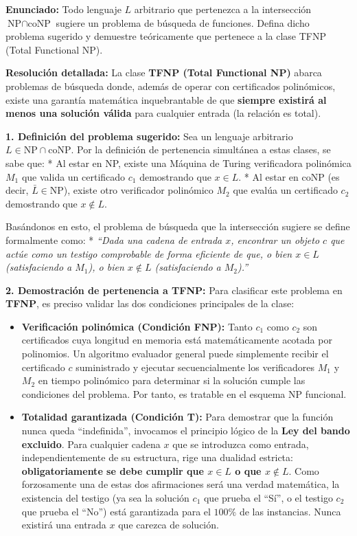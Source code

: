 \documentclass[12pt]{book} %
\providecommand{\tightlist}{%
  \setlength{\itemsep}{0pt}\setlength{\parskip}{0pt}}
\begin{document}
\textbf{Enunciado:} Todo lenguaje \(L\) arbitrario que pertenezca a la
intersección \(\text{NP} \cap \text{coNP}\) sugiere un problema de
búsqueda de funciones. Defina dicho problema sugerido y demuestre
teóricamente que pertenece a la clase TFNP (Total Functional NP).

\textbf{Resolución detallada:} La clase \textbf{TFNP (Total Functional
NP)} abarca problemas de búsqueda donde, además de operar con
certificados polinómicos, existe una garantía matemática inquebrantable
de que \textbf{siempre existirá al menos una solución válida} para
cualquier entrada (la relación es total).

\textbf{1. Definición del problema sugerido:} Sea un lenguaje arbitrario
\(L \in \text{NP} \cap \text{coNP}\). Por la definición de pertenencia
simultánea a estas clases, se sabe que: * Al estar en NP, existe una
Máquina de Turing verificadora polinómica \(M_1\) que valida un
certificado \(c_1\) demostrando que \(x \in L\). * Al estar en coNP (es
decir, \(\bar{L} \in \text{NP}\)), existe otro verificador polinómico
\(M_2\) que evalúa un certificado \(c_2\) demostrando que
\(x \notin L\).

Basándonos en esto, el problema de búsqueda que la intersección sugiere
se define formalmente como: * \emph{``Dada una cadena de entrada \(x\),
encontrar un objeto \(c\) que actúe como un testigo comprobable de forma
eficiente de que, o bien \(x \in L\) (satisfaciendo a \(M_1\)), o bien
\(x \notin L\) (satisfaciendo a \(M_2\)).''}

\textbf{2. Demostración de pertenencia a TFNP:} Para clasificar este
problema en \textbf{TFNP}, es preciso validar las dos condiciones
principales de la clase:

\begin{itemize}
\tightlist
\item
  \textbf{Verificación polinómica (Condición FNP):} Tanto \(c_1\) como
  \(c_2\) son certificados cuya longitud en memoria está matemáticamente
  acotada por polinomios. Un algoritmo evaluador general puede
  simplemente recibir el certificado \(c\) suministrado y ejecutar
  secuencialmente los verificadores \(M_1\) y \(M_2\) en tiempo
  polinómico para determinar si la solución cumple las condiciones del
  problema. Por tanto, es tratable en el esquema NP funcional.
\item
  \textbf{Totalidad garantizada (Condición T):} Para demostrar que la
  función nunca queda ``indefinida'', invocamos el principio lógico de
  la \textbf{Ley del bando excluido}. Para cualquier cadena \(x\) que se
  introduzca como entrada, independientemente de su estructura, rige una
  dualidad estricta: \textbf{obligatoriamente se debe cumplir que
  \(x \in L\) o que \(x \notin L\)}. Como forzosamente una de estas dos
  afirmaciones será una verdad matemática, la existencia del testigo (ya
  sea la solución \(c_1\) que prueba el ``Sí'', o el testigo \(c_2\) que
  prueba el ``No'') está garantizada para el \(100\%\) de las
  instancias. Nunca existirá una entrada \(x\) que carezca de solución.
\end{itemize}
\end{document}
